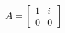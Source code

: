 \documentclass[preview]{standalone}
\begin{document}
\begin{center}
$A = \begin{bmatrix} 1 & i \\ 0 & 0 \end{bmatrix}$
\end{center}
\end{document}

